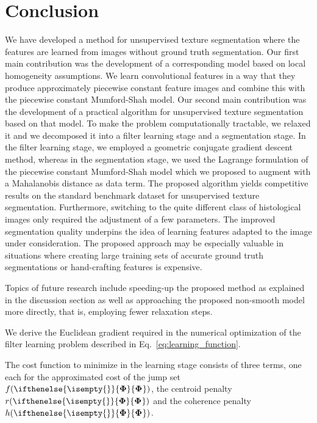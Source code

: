 \documentclass[journal]{IEEEtran}
\newcommand{\AOF}[1]{\ifthenelse{\isempty{#1}}{\boldsymbol{\Phi}}{\boldsymbol{\Phi}_{#1}}}
\begin{document}
 


\section{Conclusion}






We have developed a method
for unsupervised texture segmentation 
where the features are learned from images without ground truth segmentation.
Our first main contribution was the development of a corresponding model
based on local homogeneity assumptions.
We learn convolutional features in a way that they produce approximately piecewise constant feature images and combine this with the piecewise constant Mumford-Shah model.
Our second main contribution was the development of 
a practical algorithm for unsupervised texture segmentation based on that model.
To make the problem computationally tractable,
we relaxed it
and we decomposed it into a filter learning stage and a segmentation stage.
In the filter learning stage, we employed a geometric conjugate gradient descent method,
whereas in the segmentation stage,
we used the Lagrange formulation of the piecewise constant Mumford-Shah model 
which we proposed to augment with a Mahalanobis distance as data term.
The proposed algorithm 
yields competitive results on the standard benchmark dataset
for unsupervised texture segmentation. 
Furthermore, switching to the quite different class of histological images
only required the adjustment of a few parameters.
The improved segmentation quality underpins the idea of learning features adapted to the image under consideration. The proposed approach may be especially valuable in situations where creating large training sets of accurate ground truth segmentations or hand-crafting features is expensive.

Topics of future research include speeding-up the proposed method as explained in the discussion section as well as approaching the proposed non-smooth model more directly, that is, employing fewer relaxation steps.






 
\appendix


We derive the Euclidean gradient required in the numerical optimization of the filter learning problem described in Eq.~\eqref{eq:learning_function}.

The cost function to minimize in the learning stage consists of three terms, one each for the approximated cost of the jump set $f(\AOF{})$, the centroid penalty $r(\AOF{})$ and the coherence penalty $h(\AOF{})$.
\end{document}
